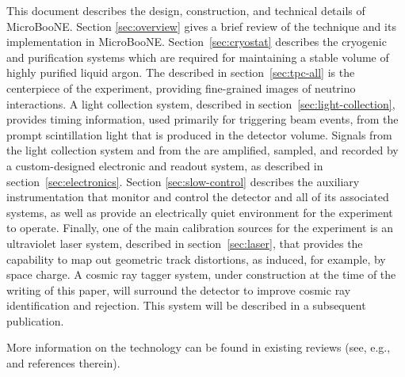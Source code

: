  

This document describes the design, construction, and technical details of MicroBooNE.  Section \ref{sec:overview} gives a brief review of the \lartpc technique and its implementation in MicroBooNE.  Section~\ref{sec:cryostat} describes the cryogenic and purification systems which are required for maintaining a stable volume of highly purified liquid argon.  The \lartpc described in section~\ref{sec:tpc-all} is the centerpiece of the experiment, providing fine-grained images of neutrino interactions.  A light collection system, described in section~\ref{sec:light-collection}, provides timing information, used primarily for triggering beam events, from the prompt scintillation light that is produced in the detector volume. Signals from the light collection system and from the \lartpc are amplified, sampled, and recorded by a custom-designed electronic and readout system, as described in section~\ref{sec:electronics}.  Section \ref{sec:slow-control} describes the auxiliary instrumentation that monitor and control the detector and all of its associated systems, as well as provide an electrically quiet environment for the experiment to operate. Finally, one of the main calibration sources for the experiment is an ultraviolet laser system, described in section~\ref{sec:laser}, that provides the capability to map out geometric track distortions, as induced, for example, by space charge.  A cosmic ray tagger system, under construction at the time of the writing of this paper, will surround the detector to improve cosmic ray identification and rejection.  This system will be described in a subsequent publication.  

More information on the \lartpc technology can be found in existing reviews (see, e.g.,~\cite{Marchionni:2013} and references therein).
